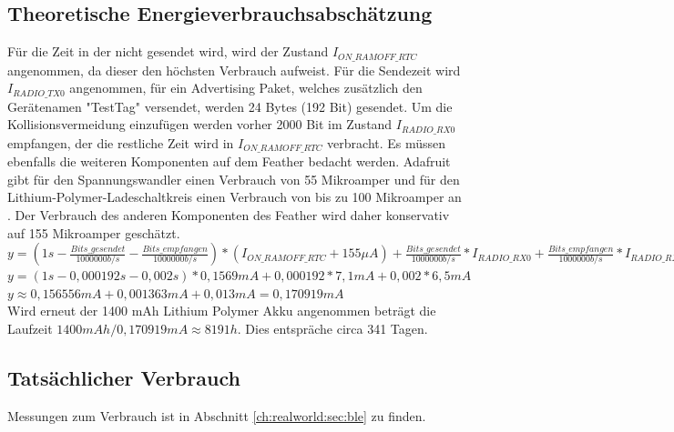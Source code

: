 \subsection{Theoretische Energieverbrauchsabschätzung}
Für die Zeit in der nicht gesendet wird, wird der Zustand $I_{ON\_RAMOFF\_RTC}$ angenommen, da dieser den höchsten Verbrauch aufweist.
Für die Sendezeit wird $I_{RADIO\_TX0}$ angenommen, für ein Advertising Paket, welches zusätzlich den Gerätenamen "TestTag" versendet, werden 24 Bytes (192 Bit) gesendet.
Um die Kollisionsvermeidung einzufügen werden vorher 2000 Bit im Zustand $I_{RADIO\_RX0}$ empfangen, der die restliche Zeit wird in $I_{ON\_RAMOFF\_RTC}$ verbracht. 
Es müssen ebenfalls die weiteren Komponenten auf dem Feather bedacht werden. 
Adafruit gibt für den Spannungswandler einen Verbrauch von 55 Mikroamper und für den Lithium-Polymer-Ladeschaltkreis einen Verbrauch von bis zu 100 Mikroamper an \cite{fried2016lora}. 
Der Verbrauch des anderen Komponenten des Feather wird daher konservativ auf 155 Mikroamper geschätzt.\\[1cm]

$y = (1s-\frac{Bits\_gesendet}{1000000 b/s} - \frac{Bits\_empfangen}{1000000 b/s}) * (I_{ON\_RAMOFF\_RTC} + 155 {\mu}A) + \frac{Bits\_gesendet}{1000000 b/s} * I_{RADIO\_RX0} + \frac{Bits\_empfangen}{1000000 b/s} * I_{RADIO\_RX0}$\\[0.5cm]
$y = (1s - 0,000192s - 0,002s) * 0,1569mA + 0,000192 * 7,1mA + 0,002 * 6,5mA$\\[0.5cm]
$y \approx 0,156556mA + 0,001363mA + 0,013mA = 0,170919mA$ \\[1cm]

Wird erneut der 1400 mAh Lithium Polymer Akku angenommen beträgt die Laufzeit $1400mAh / 0,170919mA \approx 8191h$.
Dies entspräche circa 341 Tagen.\\
 

\subsection{Tatsächlicher Verbrauch}
Messungen zum Verbrauch ist in Abschnitt \ref{ch:realworld:sec:ble} zu finden. 


